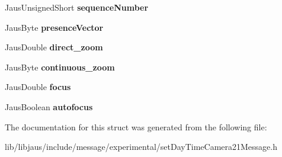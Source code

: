 \begin{DoxyCompactItemize}
\item 
\hypertarget{struct_set_day_time_camera21_message_struct_aef5064c3600f61907879147564b745e4}{\-Jaus\-Unsigned\-Short {\bfseries sequence\-Number}}\label{struct_set_day_time_camera21_message_struct_aef5064c3600f61907879147564b745e4}

\item 
\hypertarget{struct_set_day_time_camera21_message_struct_ae1e9adf2201954a04f850961a9563a73}{\-Jaus\-Byte {\bfseries presence\-Vector}}\label{struct_set_day_time_camera21_message_struct_ae1e9adf2201954a04f850961a9563a73}

\item 
\hypertarget{struct_set_day_time_camera21_message_struct_a0e58a1a7572dfb8309e4ed32701999a1}{\-Jaus\-Double {\bfseries direct\-\_\-zoom}}\label{struct_set_day_time_camera21_message_struct_a0e58a1a7572dfb8309e4ed32701999a1}

\item 
\hypertarget{struct_set_day_time_camera21_message_struct_abe44586a9a777a603a7764105a8f1364}{\-Jaus\-Byte {\bfseries continuous\-\_\-zoom}}\label{struct_set_day_time_camera21_message_struct_abe44586a9a777a603a7764105a8f1364}

\item 
\hypertarget{struct_set_day_time_camera21_message_struct_aa4ba7989f6dd5d8b8cf52ade5e824da8}{\-Jaus\-Double {\bfseries focus}}\label{struct_set_day_time_camera21_message_struct_aa4ba7989f6dd5d8b8cf52ade5e824da8}

\item 
\hypertarget{struct_set_day_time_camera21_message_struct_ab23c0e64a3f3c83afd66a0f3011bf855}{\-Jaus\-Boolean {\bfseries autofocus}}\label{struct_set_day_time_camera21_message_struct_ab23c0e64a3f3c83afd66a0f3011bf855}

\end{DoxyCompactItemize}


\-The documentation for this struct was generated from the following file\-:\begin{DoxyCompactItemize}
\item 
lib/libjaus/include/message/experimental/set\-Day\-Time\-Camera21\-Message.\-h\end{DoxyCompactItemize}
